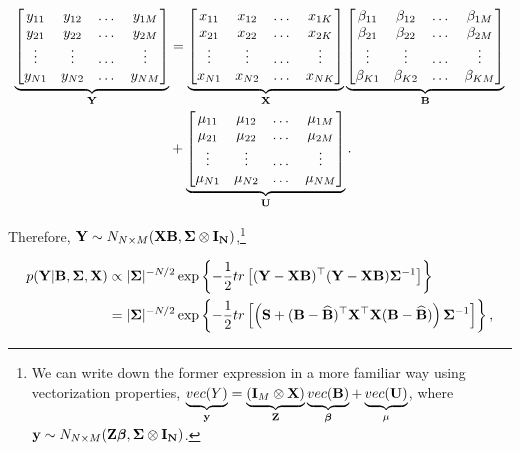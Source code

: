 \begin{align*}
	\underbrace{
		\begin{bmatrix}
			y_{11} & y_{12} & \dots & y_{1M}\\
			y_{21} & y_{22} & \dots & y_{2M}\\
			\vdots & \vdots & \dots & \vdots\\
			y_{N1} & y_{N2} & \dots & y_{NM}\\
	\end{bmatrix}}_{\bf{Y}}
	&=
	\underbrace{\begin{bmatrix}
			x_{11} & x_{12} & \dots & x_{1K}\\
			x_{21} & x_{22} & \dots & x_{2K}\\
			\vdots & \vdots & \dots & \vdots\\
			x_{N1} & x_{N2} & \dots & x_{NK}\\
	\end{bmatrix}}_{\bf{X}}
	\underbrace{
		\begin{bmatrix}
			\beta_{11} & \beta_{12} & \dots & \beta_{1M}\\
			\beta_{21} & \beta_{22} & \dots & \beta_{2M}\\
			\vdots & \vdots & \dots & \vdots\\
			\beta_{K1} & \beta_{K2} & \dots & \beta_{KM}\\
	\end{bmatrix}}_{\bf{B}}\\
	&+
	\underbrace{\begin{bmatrix}
			\mu_{11} & \mu_{12} & \dots & \mu_{1M}\\
			\mu_{21} & \mu_{22} & \dots & \mu_{2M}\\
			\vdots & \vdots & \dots & \vdots\\
			\mu_{N1} & \mu_{N2} & \dots & \mu_{NM}\\
	\end{bmatrix}}_{\bf{U}}.
\end{align*}

Therefore, ${\bf{Y}}\sim N_{N\times M}({\bf{X}}{\bf{B}},\bf{\Sigma}\otimes {\bf{I}}_N)$,\footnote{We can write down the former expression in a more familiar way using vectorization properties,
$\underbrace{vec(Y)}_{\bf{y}}=\underbrace{({\bf{I}}_M\otimes {\bf{X}})}_{{\bf{Z}}}\underbrace{vec({\bf{B}})}_{\bm{\beta}}+\underbrace{vec({\bf{U}})}_{\mu}$, where ${\bf{y}}\sim N_{N\times M}({\bf{Z}}\bm{\beta},\bf{\Sigma}\otimes {\bf{I}}_N)$.}

\begin{align*}
	p({\bf{Y}}| {\bf{B}},{\bm{\Sigma}}, {\bf{X}})&\propto |{{\bf \Sigma}}|^{-N/2}\exp\left\lbrace -\frac{1}{2}tr\left[({\bf{Y}}-{\bf{X}}{\bf{B}})^{\top}({\bf{Y}}-{\bf{X}}{\bf{B}}){{\bf \Sigma}}^{-1}\right]\right\rbrace
	\\
	&=|{{\bf \Sigma}}|^{-N/2}\exp\left\lbrace -\frac{1}{2}tr\left[\left({\bf{S}}+({\bf{B}}-\widehat{\bf{B}})^{\top}{\bf{X}}^{\top}{\bf{X}}({\bf{B}}-\widehat{\bf{B}})\right){{\bf \Sigma}}^{-1}\right]\right\rbrace,
\end{align*}

